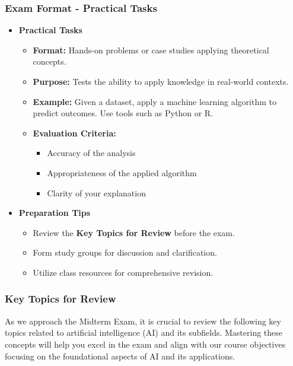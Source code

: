 \documentclass[aspectratio=169]{beamer}
\begin{document}
\begin{frame}[fragile]
    \frametitle{Exam Format - Practical Tasks}
    \begin{itemize}
        \item \textbf{Practical Tasks}
        \begin{itemize}
            \item \textbf{Format:} Hands-on problems or case studies applying theoretical concepts.
            \item \textbf{Purpose:} Tests the ability to apply knowledge in real-world contexts.
            \item \textbf{Example:} Given a dataset, apply a machine learning algorithm to predict outcomes. Use tools such as Python or R.
            \item \textbf{Evaluation Criteria:}
            \begin{itemize}
                \item Accuracy of the analysis
                \item Appropriateness of the applied algorithm
                \item Clarity of your explanation
            \end{itemize}
        \end{itemize}
        
        \item \textbf{Preparation Tips}
        \begin{itemize}
            \item Review the \textbf{Key Topics for Review} before the exam.
            \item Form study groups for discussion and clarification.
            \item Utilize class resources for comprehensive revision.
        \end{itemize}
    \end{itemize}
\end{frame}

\begin{frame}[fragile]
    \frametitle{Key Topics for Review}
    As we approach the Midterm Exam, it is crucial to review the following key topics related to artificial intelligence (AI) 
    and its subfields. Mastering these concepts will help you excel in the exam and align with our course objectives focusing on the foundational aspects of AI and its applications.
\end{frame}
\end{document}

